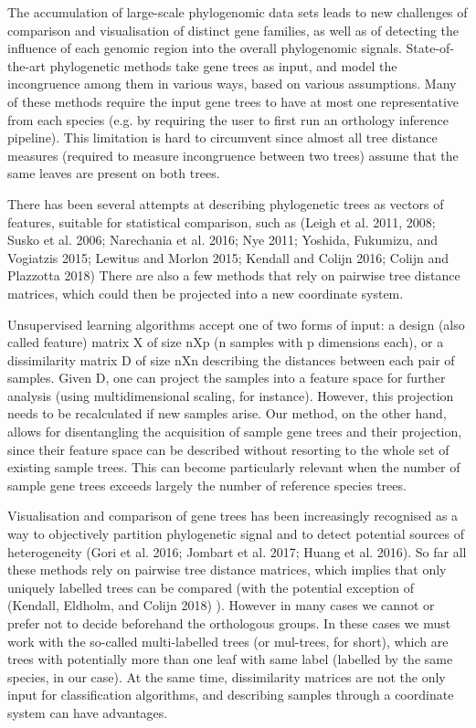 
The accumulation of large-scale phylogenomic data sets leads to new challenges of comparison and visualisation of
distinct gene families, as well as of detecting the influence of each genomic region into the overall phylogenomic
signals. 
State-of-the-art phylogenetic methods take gene trees as input, and model the incongruence among them in
various ways, based on various assumptions. 
Many of these methods require the input gene trees to have at most one
representative from each species (e.g. by requiring the user to first run an orthology inference pipeline). This
limitation is hard to circumvent since almost all tree distance measures (required to measure incongruence between two
trees) assume that the same leaves are present on both trees.

There has been several attempts at describing phylogenetic trees as vectors of features, suitable for statistical
comparison, such as (Leigh et al. 2011, 2008; Susko et al. 2006; Narechania et al. 2016; Nye 2011; Yoshida, Fukumizu,
and Vogiatzis 2015; Lewitus and Morlon 2015; Kendall and Colijn 2016; Colijn and Plazzotta 2018) There are also a few
methods that rely on pairwise tree distance matrices, which could then be projected into a new coordinate system.

Unsupervised learning algorithms accept one of two forms of input: a design (also called feature) matrix X of size nXp
(n samples with p dimensions each), or a dissimilarity matrix D of size nXn describing the distances between each pair
of samples. Given D, one can project the samples into a feature space for further analysis (using multidimensional
scaling, for instance). However, this projection needs to be recalculated if new samples arise. Our method, on the other
hand, allows for disentangling the acquisition of sample gene trees and their projection, since their feature space can
be described without resorting to the whole set of existing sample trees. This can become particularly relevant when the
number of sample gene trees exceeds largely the number of reference species trees.

Visualisation and comparison of gene trees has been increasingly recognised as a way to objectively partition
phylogenetic signal and to detect potential sources of heterogeneity (Gori et al. 2016; Jombart et al. 2017; Huang et
al. 2016). So far all these methods rely on pairwise tree distance matrices, which implies that only uniquely labelled
trees can be compared (with the potential exception of (Kendall, Eldholm, and Colijn 2018) ). However in many cases we
cannot or prefer not to decide beforehand the orthologous groups. In these cases we must work with  the so-called
multi-labelled trees (or mul-trees, for short), which are trees with potentially more than one leaf with same label
(labelled by the same species, in our case). At the same time, dissimilarity matrices are not the only input for
classification algorithms, and describing samples through a coordinate system can have advantages.

